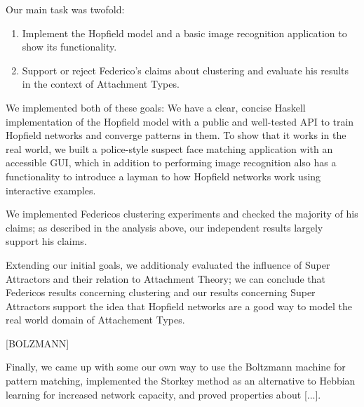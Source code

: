 Our main task was twofold:

\begin{enumerate}
\item Implement the Hopfield model and a basic image recognition application to show its functionality.
\item Support or reject Federico's claims about clustering and evaluate his results in the context of Attachment Types.
\end{enumerate}

We implemented both of these goals: We have a clear, concise Haskell implementation of the Hopfield model with a public and well-tested API to train Hopfield networks and converge patterns in them. To show that it works in the real world, we built a police-style suspect face matching application with an accessible GUI, which in addition to performing image recognition also has a functionality to introduce a layman to how Hopfield networks work using interactive examples.

We implemented Federicos clustering experiments and checked the majority of his claims; as described in the analysis above, our independent results largely support his claims.

Extending our initial goals, we additionaly evaluated the influence of Super Attractors and their relation to Attachment Theory; we can conclude that Federicos results concerning clustering and our results concerning Super Attractors support the idea that Hopfield networks are a good way to model the real world domain of Attachement Types.

[BOLZMANN]

Finally, we came up with some our own way to use the Boltzmann machine for pattern matching, implemented the Storkey method as an alternative to Hebbian learning for increased network capacity, and proved properties about [...].
